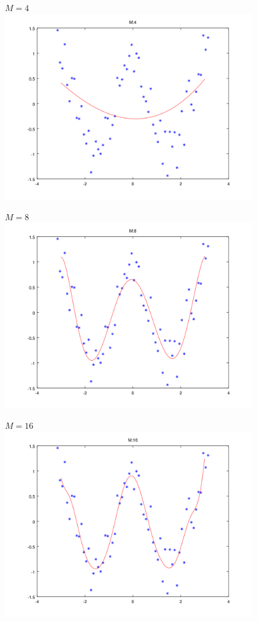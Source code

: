 \documentclass{article}
\begin{document}
\begin{minipage}[t]{0.5\textwidth}
	\centering
	$M = 4$ \\
	\includegraphics[width = 0.8\textwidth]{images/4}
	
	$M = 8$ \\
	\includegraphics[width = 0.8\textwidth]{images/8}
	
	$M = 16$ \\
	\includegraphics[width = 0.8\textwidth]{images/16}
\end{minipage}
\end{document}
